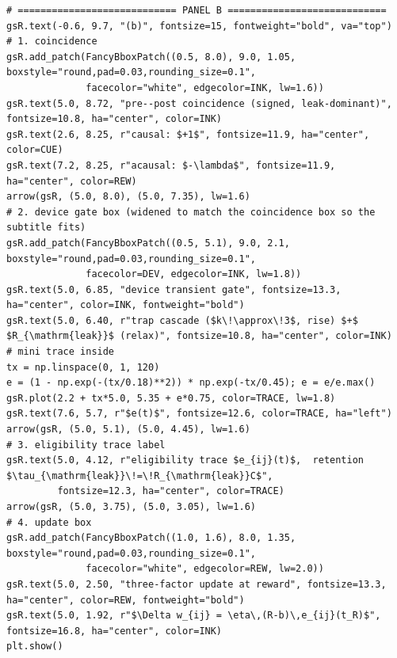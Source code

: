 \begin{lstlisting}[caption={schematics.ipynb code cell 6},label={lst:mrl-nb-schematics-6}]
# ============================ PANEL B ============================
gsR.text(-0.6, 9.7, "(b)", fontsize=15, fontweight="bold", va="top")
# 1. coincidence
gsR.add_patch(FancyBboxPatch((0.5, 8.0), 9.0, 1.05, boxstyle="round,pad=0.03,rounding_size=0.1",
              facecolor="white", edgecolor=INK, lw=1.6))
gsR.text(5.0, 8.72, "pre--post coincidence (signed, leak-dominant)", fontsize=10.8, ha="center", color=INK)
gsR.text(2.6, 8.25, r"causal: $+1$", fontsize=11.9, ha="center", color=CUE)
gsR.text(7.2, 8.25, r"acausal: $-\lambda$", fontsize=11.9, ha="center", color=REW)
arrow(gsR, (5.0, 8.0), (5.0, 7.35), lw=1.6)
# 2. device gate box (widened to match the coincidence box so the subtitle fits)
gsR.add_patch(FancyBboxPatch((0.5, 5.1), 9.0, 2.1, boxstyle="round,pad=0.03,rounding_size=0.1",
              facecolor=DEV, edgecolor=INK, lw=1.8))
gsR.text(5.0, 6.85, "device transient gate", fontsize=13.3, ha="center", color=INK, fontweight="bold")
gsR.text(5.0, 6.40, r"trap cascade ($k\!\approx\!3$, rise) $+$ $R_{\mathrm{leak}}$ (relax)", fontsize=10.8, ha="center", color=INK)
# mini trace inside
tx = np.linspace(0, 1, 120)
e = (1 - np.exp(-(tx/0.18)**2)) * np.exp(-tx/0.45); e = e/e.max()
gsR.plot(2.2 + tx*5.0, 5.35 + e*0.75, color=TRACE, lw=1.8)
gsR.text(7.6, 5.7, r"$e(t)$", fontsize=12.6, color=TRACE, ha="left")
arrow(gsR, (5.0, 5.1), (5.0, 4.45), lw=1.6)
# 3. eligibility trace label
gsR.text(5.0, 4.12, r"eligibility trace $e_{ij}(t)$,  retention $\tau_{\mathrm{leak}}\!=\!R_{\mathrm{leak}}C$",
         fontsize=12.3, ha="center", color=TRACE)
arrow(gsR, (5.0, 3.75), (5.0, 3.05), lw=1.6)
# 4. update box
gsR.add_patch(FancyBboxPatch((1.0, 1.6), 8.0, 1.35, boxstyle="round,pad=0.03,rounding_size=0.1",
              facecolor="white", edgecolor=REW, lw=2.0))
gsR.text(5.0, 2.50, "three-factor update at reward", fontsize=13.3, ha="center", color=REW, fontweight="bold")
gsR.text(5.0, 1.92, r"$\Delta w_{ij} = \eta\,(R-b)\,e_{ij}(t_R)$", fontsize=16.8, ha="center", color=INK)
plt.show()
\end{lstlisting}

